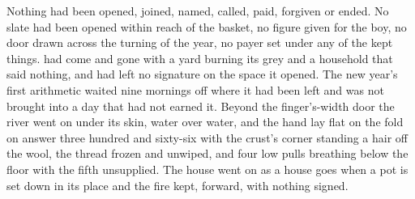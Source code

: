 Nothing had been opened, joined, named, called, paid, forgiven or ended. No slate had been opened within reach of the basket, no figure given for the boy, no door drawn across the turning of the year, no payer set under any of the kept things.  had come and gone with a yard burning its grey and a household that said nothing, and had left no signature on the space it opened. The new year's first arithmetic waited nine mornings off where it had been left and was not brought into a day that had not earned it. Beyond the finger's-width door the river went on under its skin, water over water, and the hand lay flat on the fold on answer three hundred and sixty-six with the crust's corner standing a hair off the wool, the thread frozen and unwiped, and four low pulls breathing below the floor with the fifth unsupplied. The house went on as a house goes when a pot is set down in its place and the fire kept, forward, with nothing signed.
